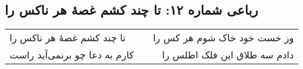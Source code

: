 \begin{center}
\section*{رباعی شماره ۱۲: تا چند کشم غصهٔ هر ناکس را}
\label{sec:sh012}
\begin{longtable}{l p{0.5cm} r}
تا چند کشم غصهٔ هر ناکس را
&&
وز خست خود خاک شوم هر کس را
\\
کارم به دعا چو برنمی‌آید راست
&&
دادم سه طلاق این فلک اطلس را
\\
\end{longtable}
\end{center}
